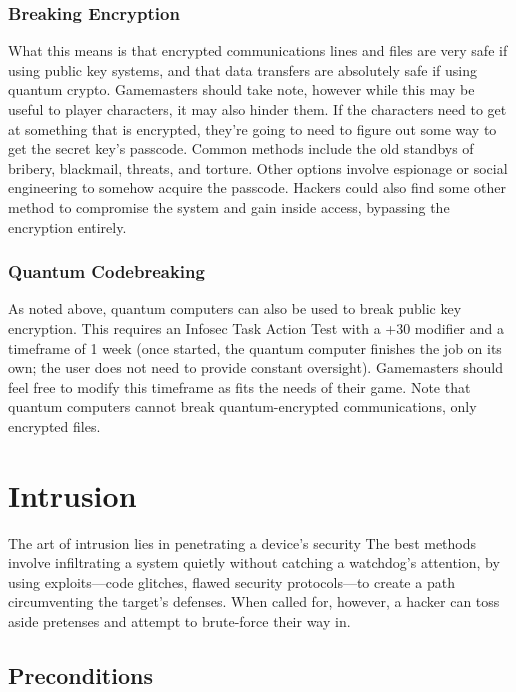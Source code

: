 \subsubsection{Breaking Encryption}

What this means is that encrypted communications 
lines and files are very safe if using public key systems, 
and that data transfers are absolutely safe if using 
quantum crypto. Gamemasters should take note, however
while this may be useful to player characters, it
may also hinder them. If the characters need to get at 
something that is encrypted, they're going to need to 
figure out some way to get the secret key's passcode. 
Common methods include the old standbys of bribery, 
blackmail, threats, and torture. Other options involve 
espionage or social engineering to somehow acquire 
the passcode. Hackers could also find some other 
method to compromise the system and gain inside 
access, bypassing the encryption entirely.

\subsubsection{Quantum Codebreaking}

As noted above, quantum computers can also be used 
to break public key encryption. This requires an Infosec 
Task Action Test with a +30 modifier and a timeframe 
of 1 week (once started, the quantum computer finishes 
the job on its own; the user does not need to provide 
constant oversight). Gamemasters should feel free to 
modify this timeframe as fits the needs of their game. 
Note that quantum computers cannot break quantum-encrypted
communications, only encrypted files.

\section{Intrusion}

The art of intrusion lies in penetrating a device's security
The best methods involve infiltrating a system quietly
without catching a watchdog's attention, by using
exploits—code glitches, flawed security protocols—to 
create a path circumventing the target's defenses. When 
called for, however, a hacker can toss aside pretenses 
and attempt to brute-force their way in.

\subsection{Preconditions}

